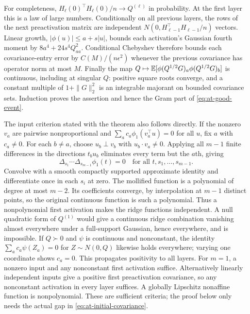 For completeness, $H_\ell(0)^\top H_\ell(0)/n\to Q^{(\ell)}$ in
probability.  At the first layer this is a law of large numbers.
Conditionally on all previous layers, the rows of the next preactivation
matrix are independent $N(0,H_{\ell-1}^\top H_{\ell-1}/n)$ vectors.
Linear growth, $|\phi(u)|\le a+s|u|$, bounds each activation's Gaussian
fourth moment by $8a^4+24s^4Q_{aa}^2$.  Conditional Chebyshev therefore
bounds each covariance-entry error by $C(M)/(n\epsilon^2)$ whenever the
previous covariance has operator norm at most $M$.  Finally the map
$Q\mapsto\mathbb{E}[\phi(Q^{1/2}G)_a\phi(Q^{1/2}G)_b]$ is continuous,
including at singular $Q$: positive square roots converge, and a constant
multiple of $1+\|G\|_2^2$ is an integrable majorant on bounded covariance
sets.  Induction proves the assertion and hence the Gram part of
\eqref{eq:at-good-event}.

The input criterion stated with the theorem also follows directly.
If the nonzero $v_a$ are pairwise nonproportional and
$\sum_a c_a\phi_1(v_a^\top u)=0$ for all $u$, fix $a$ with
$c_a\ne0$.  For each $b\ne a$, choose $u_b\perp v_b$ with
$u_b\cdot v_a\ne0$.  Applying all $m-1$ finite differences in the
directions $t_bu_b$ eliminates every term but the $a$th, giving
\[
 \Delta_{s_1}\cdots\Delta_{s_{m-1}}\phi_1(t)=0
 \quad\text{for all }t,s_1,\ldots,s_{m-1}.
\]
Convolve with a smooth compactly supported approximate identity and
differentiate once in each $s_i$ at zero.  The mollified function is a
polynomial of degree at most $m-2$.  Its coefficients converge, by
interpolation at $m-1$ distinct points, so the original continuous
function is such a polynomial.  Thus a nonpolynomial first activation
makes the ridge functions independent.  A null quadratic form of
$Q^{(1)}$ would give a continuous ridge combination vanishing almost
everywhere under a full-support Gaussian, hence everywhere, and is
impossible.  If $Q\succ0$ and $\psi$ is continuous and nonconstant,
the identity $\sum_a c_a\psi(Z_a)=0$ for $Z\sim N(0,Q)$ likewise holds
everywhere; varying one coordinate shows $c_a=0$.  This propagates
positivity to all layers.  For $m=1$, a nonzero input and any nonconstant
first activation suffice.  Alternatively linearly independent inputs
give a positive first preactivation covariance, so any nonconstant
activation in every layer suffices.  A globally Lipschitz nonaffine
function is nonpolynomial.  These are sufficient criteria; the proof
below only needs the actual gap in \eqref{eq:at-initial-covariance}.

